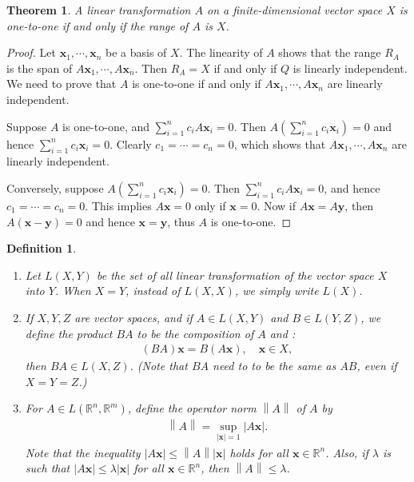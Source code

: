 \documentclass[11pt]{book}
\newtheorem{definition}{Definition}[chapter]
\newtheorem{theorem}{Theorem}[chapter]
\theoremstyle{definition}
\numberwithin{equation}{chapter}
\begin{document}
\medskip

\begin{theorem}\label{th_71}
A linear transformation $A$ on a finite-dimensional vector space $X$ is one-to-one if and only if the range of $A$ is $X$.
\end{theorem}
\begin{proof}
Let $\mathbf{x}_1, \cdots, \mathbf{x}_n$ be a basis of $X$. The linearity of $A$ shows that the range $R_A$ is the span of $A\mathbf{x}_1, \cdots, A\mathbf{x}_n$. Then $R_A = X$ if and only if $Q$ is linearly independent. We need to prove that $A$ is one-to-one if and only if $A\mathbf{x}_1, \cdots, A\mathbf{x}_n$ are linearly independent.

Suppose $A$ is one-to-one, and $\sum^n_{i=1} c_i A \mathbf{x}_i = 0$. Then $A \left(\sum^n_{i=1} c_i \mathbf{x}_i\right) = 0$ and hence $\sum^n_{i=1} c_i \mathbf{x}_i = 0$. Clearly $c_1 = \cdots = c_n = 0$, which shows that $A\mathbf{x}_1, \cdots, A\mathbf{x}_n$ are linearly independent.

Conversely, suppose $A \left(\sum^n_{i=1} c_i \mathbf{x}_i\right) = 0$. Then $\sum^n_{i=1} c_i A \mathbf{x}_i = 0$, and hence $c_1 = \cdots = c_n = 0$. This implies $A\mathbf{x} = 0$ only if $\mathbf{x} = 0$. Now if $A\mathbf{x} = A\mathbf{y}$, then $A(\mathbf{x} - \mathbf{y}) = 0$ and hence $\mathbf{x} = \mathbf{y}$, thus $A$ is one-to-one.
\end{proof}

\medskip

\begin{definition}\label{def_74}
~\begin{enumerate}[label=(\alph*)]
    \item Let $L(X,Y)$ be the set of all linear transformation of the vector space $X$ into $Y$. When $X = Y$, instead of $L(X,X)$, we simply write $L(X)$. 
    
    \item If $X,Y,Z$ are vector spaces, and if $A \in L(X,Y)$ and $B \in L(Y,Z)$, we define the product $BA$ to be the composition of $A$ and :
    \begin{align*}
        (BA)\mathbf{x} = B(A\mathbf{x}), \quad \mathbf{x} \in X,
    \end{align*}
    then $BA \in L(X,Z)$. (Note that $BA$ need to to be the same as $AB$, even if $X = Y = Z$.)
    
    \item For $A \in L(\mathbb{R}^n,\mathbb{R}^m)$, define the operator norm $\left\|A\right\|$ of $A$ by
    \begin{align*}
        \left\|A\right\| = \sup_{\left|\mathbf{x}\right|=1} \left|A\mathbf{x}\right|.
    \end{align*}
    Note that the inequality $\left|A\mathbf{x}\right| \leq \left\|A\right\| \left|\mathbf{x}\right|$ holds for all $\mathbf{x} \in \mathbb{R}^n$. Also, if $\lambda$ is such that $\left|A\mathbf{x}\right| \leq \lambda \left|\mathbf{x}\right|$ for all $\mathbf{x} \in \mathbb{R}^n$, then $\left\|A\right\| \leq \lambda$.
\end{enumerate}
\end{definition}
\end{document}
